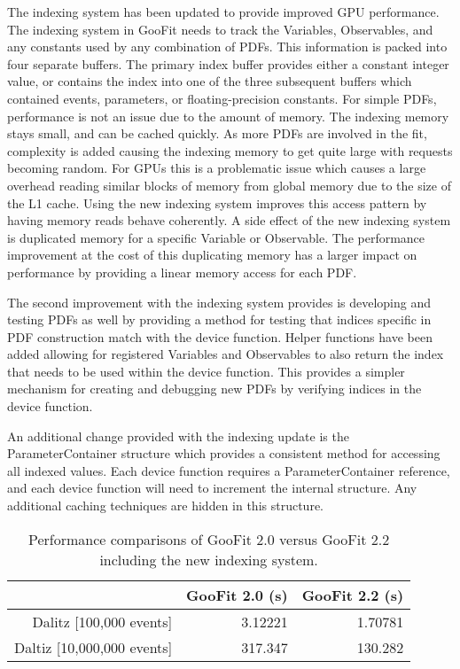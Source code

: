 \documentclass{webofc}
\begin{document}
The indexing system has been updated to provide improved GPU performance. The indexing system in GooFit needs to track the Variables, Observables, and any constants used by any combination of PDFs. This information is packed into four separate buffers. The primary index buffer provides either a constant integer value, or contains the index into one of the three subsequent buffers which contained events, parameters, or floating-precision constants\cite{GooFit}. For simple PDFs, performance is not an issue due to the amount of memory. The indexing memory stays small, and can be cached quickly. As more PDFs are involved in the fit, complexity is added causing the indexing memory to get quite large with requests becoming random. For GPUs this is a problematic issue which causes a large overhead reading similar blocks of memory from global memory due to the size of the L1 cache. Using the new indexing system improves this access pattern by having memory reads behave coherently. A side effect of the new indexing system is duplicated memory for a specific Variable or Observable. The performance improvement at the cost of this duplicating memory has a larger impact on performance by providing a linear memory access for each PDF.

The second improvement with the indexing system provides is developing and testing PDFs as well by providing a method for testing that indices specific in PDF construction match with the device function. Helper functions have been added allowing for registered Variables and Observables to also return the index that needs to be used within the device function. This provides a simpler mechanism for creating and debugging new PDFs by verifying indices in the device function. 

An additional change provided with the indexing update is the ParameterContainer structure which provides a consistent method for accessing all indexed values. Each device function requires a ParameterContainer reference, and each device function will need to increment the internal structure. Any additional caching techniques are hidden in this structure.

\begin{table}
	\centering
	\begin{tabular}{ |r|r|r| }
		\hline
			 & GooFit 2.0 (s) & GooFit 2.2 (s) \\
		\hline
			Dalitz [100,000 events] & 3.12221 & 1.70781 \\
		\hline
			Daltiz [10,000,000 events] & 317.347 & 130.282 \\
		\hline
	\end{tabular}
	\caption{Performance comparisons of GooFit 2.0 versus GooFit 2.2 including the new indexing system.}
	\label{table:1}
\end{table}
\end{document}

